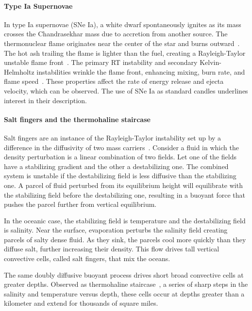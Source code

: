 \paragraph{Type Ia Supernovae}
In type Ia supernovae (SNe Ia), a white dwarf spontaneously ignites as its mass crosses the Chandrasekhar mass due to accretion from another source.
The thermonuclear flame originates near the center of the star and burns outward~\cite{oran2007origins}.
The hot ash trailing the flame is lighter than the fuel, creating a Rayleigh-Taylor unstable flame front~\cite{Zingale2005}.
The primary RT instability and secondary Kelvin-Helmholtz instabilities wrinkle the flame front, enhancing mixing, burn rate, and flame speed~\cite{hicks2015rayleigh}.
These properties affect the rate of energy release and ejecta velocity, which can be observed.
The use of SNe Ia as standard candles underlines interest in their description.

\paragraph{Salt fingers and the thermohaline staircase}
Salt fingers are an instance of the Rayleigh-Taylor instability set up by a difference in the diffusivity of two mass carriers~\cite{Stern1969, Linden1973}.
Consider a fluid in which the density perturbation is a linear combination of two fields.
Let one of the fields have a stabilizing gradient and the other a destabilizing one.
The combined system is unstable if the destabilizing field is less diffusive than the stabilizing one.
A parcel of fluid perturbed from its equilibrium height will equilibrate with the stabilizing field before the destabilizing one, resulting in a buoyant force that pushes the parcel further from vertical equilibrium.

In the oceanic case, the stabilizing field is temperature and the destabilizing field is salinity.
Near the surface, evaporation perturbs the salinity field creating parcels of salty dense fluid.
As they sink, the parcels cool more quickly than they diffuse salt, further increasing their density.
This flow drives tall vertical convective cells, called salt fingers, that mix the oceans.

The same doubly diffusive buoyant process drives short broad convective cells at greater depths.
Observed as thermohaline staircase~\cite{Tait1971}, a series of sharp steps in the salinity and temperature versus depth, these cells occur at depths greater than a kilometer and extend for thousands of square miles.

